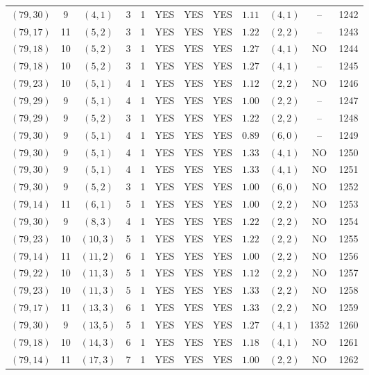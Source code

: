 \begin{longtable}{|c|c|c|c|c|c|c|c|c|c|c|c|}
$(79,30)$ & 9 & $(4,1)$ & 3 & 1 & YES & YES & YES & $1.11$ & $(4,1)$ & -- & 1242\\
$(79,17)$ & 11 & $(5,2)$ & 3 & 1 & YES & YES & YES & $1.22$ & $(2,2)$ & -- & 1243\\
$(79,18)$ & 10 & $(5,2)$ & 3 & 1 & YES & YES & YES & $1.27$ & $(4,1)$ & NO & 1244\\
$(79,18)$ & 10 & $(5,2)$ & 3 & 1 & YES & YES & YES & $1.27$ & $(4,1)$ & -- & 1245\\
$(79,23)$ & 10 & $(5,1)$ & 4 & 1 & YES & YES & YES & $1.12$ & $(2,2)$ & NO & 1246\\
$(79,29)$ & 9 & $(5,1)$ & 4 & 1 & YES & YES & YES & $1.00$ & $(2,2)$ & -- & 1247\\
$(79,29)$ & 9 & $(5,2)$ & 3 & 1 & YES & YES & YES & $1.22$ & $(2,2)$ & -- & 1248\\
$(79,30)$ & 9 & $(5,1)$ & 4 & 1 & YES & YES & YES & $0.89$ & $(6,0)$ & -- & 1249\\
$(79,30)$ & 9 & $(5,1)$ & 4 & 1 & YES & YES & YES & $1.33$ & $(4,1)$ & NO & 1250\\
$(79,30)$ & 9 & $(5,1)$ & 4 & 1 & YES & YES & YES & $1.33$ & $(4,1)$ & NO & 1251\\
$(79,30)$ & 9 & $(5,2)$ & 3 & 1 & YES & YES & YES & $1.00$ & $(6,0)$ & NO & 1252\\
$(79,14)$ & 11 & $(6,1)$ & 5 & 1 & YES & YES & YES & $1.00$ & $(2,2)$ & NO & 1253\\
$(79,30)$ & 9 & $(8,3)$ & 4 & 1 & YES & YES & YES & $1.22$ & $(2,2)$ & NO & 1254\\
$(79,23)$ & 10 & $(10,3)$ & 5 & 1 & YES & YES & YES & $1.22$ & $(2,2)$ & NO & 1255\\
$(79,14)$ & 11 & $(11,2)$ & 6 & 1 & YES & YES & YES & $1.00$ & $(2,2)$ & NO & 1256\\
$(79,22)$ & 10 & $(11,3)$ & 5 & 1 & YES & YES & YES & $1.12$ & $(2,2)$ & NO & 1257\\
$(79,23)$ & 10 & $(11,3)$ & 5 & 1 & YES & YES & YES & $1.33$ & $(2,2)$ & NO & 1258\\
$(79,17)$ & 11 & $(13,3)$ & 6 & 1 & YES & YES & YES & $1.33$ & $(2,2)$ & NO & 1259\\
$(79,30)$ & 9 & $(13,5)$ & 5 & 1 & YES & YES & YES & $1.27$ & $(4,1)$ & 1352 & 1260\\
$(79,18)$ & 10 & $(14,3)$ & 6 & 1 & YES & YES & YES & $1.18$ & $(4,1)$ & NO & 1261\\
$(79,14)$ & 11 & $(17,3)$ & 7 & 1 & YES & YES & YES & $1.00$ & $(2,2)$ & NO & 1262\\

\end{longtable}
